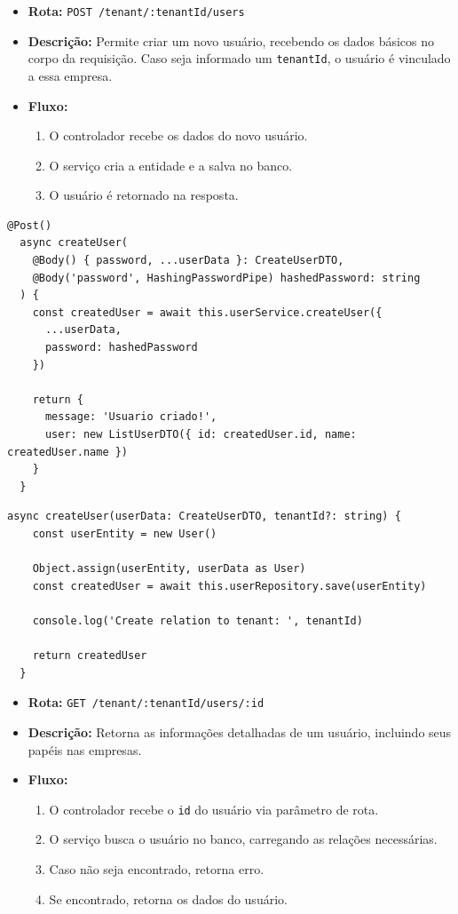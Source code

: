 \begin{itemize}
	\item \textbf{Rota:} \texttt{POST /tenant/:tenantId/users}
	\item \textbf{Descrição:} Permite criar um novo usuário, recebendo os dados básicos no corpo da requisição. Caso seja informado um \texttt{tenantId}, o usuário é vinculado a essa empresa.
	\item \textbf{Fluxo:}
	\begin{enumerate}
		\item O controlador recebe os dados do novo usuário.
		\item O serviço cria a entidade e a salva no banco.
		\item O usuário é retornado na resposta.
	\end{enumerate}
\end{itemize}

\begin{lstlisting}[caption={Exemplo de \textit{controller} para criação de usuário.},label={cod:create-user-controller}]
	@Post()
  async createUser(
    @Body() { password, ...userData }: CreateUserDTO,
    @Body('password', HashingPasswordPipe) hashedPassword: string
  ) {
    const createdUser = await this.userService.createUser({
      ...userData,
      password: hashedPassword
    })

    return {
      message: 'Usuario criado!',
      user: new ListUserDTO({ id: createdUser.id, name: createdUser.name })
    }
  }
\end{lstlisting}

\begin{lstlisting}[caption={Exemplo de \textit{service} para criação de usuário.},label={cod:create-user-service}]
	async createUser(userData: CreateUserDTO, tenantId?: string) {
    const userEntity = new User()

    Object.assign(userEntity, userData as User)
    const createdUser = await this.userRepository.save(userEntity)

    console.log('Create relation to tenant: ', tenantId)

    return createdUser
  }
\end{lstlisting}

\begin{itemize}
	\item \textbf{Rota:} \texttt{GET /tenant/:tenantId/users/:id}
	\item \textbf{Descrição:} Retorna as informações detalhadas de um usuário, incluindo seus papéis nas empresas.
	\item \textbf{Fluxo:}
	\begin{enumerate}
		\item O controlador recebe o \texttt{id} do usuário via parâmetro de rota.
		\item O serviço busca o usuário no banco, carregando as relações necessárias.
		\item Caso não seja encontrado, retorna erro.
		\item Se encontrado, retorna os dados do usuário.
	\end{enumerate}
\end{itemize}

